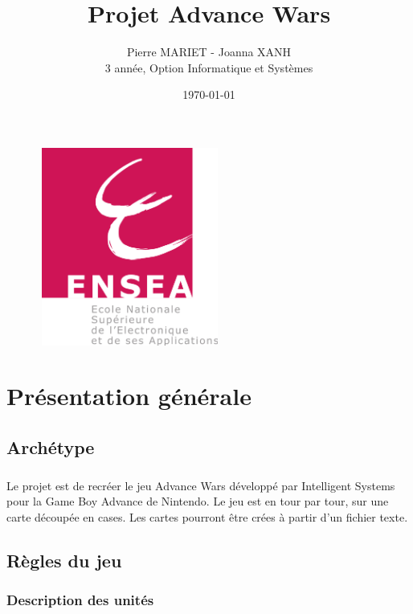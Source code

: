 \documentclass[12pt]{report}
\title{Projet Advance Wars}
\date{\today}
\author{Pierre MARIET - Joanna XANH\\
3\up{ème} année, Option Informatique et Systèmes}
\begin{document}
\begin{figure}
\includegraphics[width=60mm, height=65mm]{logoENSEA.png}
\end{figure}

\maketitle
\thispagestyle{empty}
\newpage

\tableofcontents
\newpage

\chapter{Présentation générale}
    \section{Archétype}
    \paragraph{}Le projet est de recréer le jeu Advance Wars\textsc{\texttrademark} développé par Intelligent Systems\up{\textregistered} pour la Game Boy Advance\textsc{\texttrademark} de Nintendo\up{\textregistered}.\newline
    Le jeu est en tour par tour, sur une carte découpée en cases. Les cartes pourront être crées à partir d'un fichier texte.
    \section{Règles du jeu}
    \subsection{Description des unités}
\end{document}
